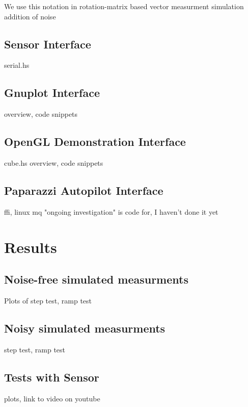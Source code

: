 \documentclass[12pt]{report}
\begin{document}
We use this notation in 
rotation-matrix based vector measurment simulation
addition of noise
\subsection{Sensor Interface}
serial.hs
\subsection{Gnuplot Interface}
overview, code snippets
\subsection{OpenGL Demonstration Interface}
cube.hs overview, code snippets 
\subsection{Paparazzi Autopilot Interface}
ffi, linux mq
"ongoing investigation" is code for, I haven't done it yet

\section{Results}
\subsection{Noise-free simulated measurments}
Plots of step test, ramp test
\subsection{Noisy simulated measurments}
step test, ramp test
\subsection{Tests with Sensor}
plots, link to video on youtube
\end{document}
